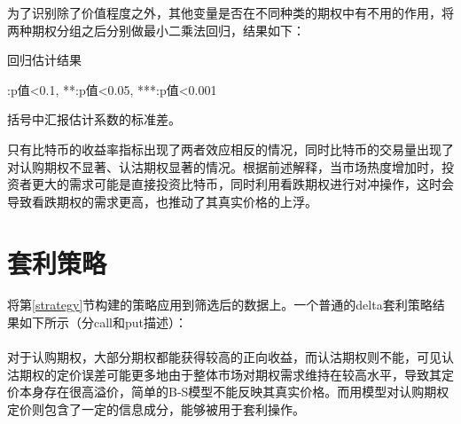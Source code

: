 \par{为了识别除了价值程度之外，其他变量是否在不同种类的期权中有不用的作用，将两种期权分组之后分别做最小二乘法回归，结果如下：}
\newpage
{}
\begin{center}
    \begin{threeparttable}[H]

        \caption{回归估计结果}
        
        \begin{tablenotes}
            \footnotesize
            \item *:p值<0.1, **:p值<0.05, ***:p值<0.001
            \item 括号中汇报估计系数的标准差。
        \end{tablenotes}
    \end{threeparttable}
\end{center}
\newpage
\restoregeometry
只有比特币的收益率指标出现了两者效应相反的情况，同时比特币的交易量出现了对认购期权不显著、认沽期权显著的情况。根据前述解释，当市场热度增加时，投资者更大的需求可能是直接投资比特币，同时利用看跌期权进行对冲操作，这时会导致看跌期权的需求更高，也推动了其真实价格的上浮。
\section{套利策略}
将第\ref{strategy}节构建的策略应用到筛选后的数据上。一个普通的delta套利策略结果如下所示（分call和put描述）：
~\\


~\\
对于认购期权，大部分期权都能获得较高的正向收益，而认沽期权则不能，可见认沽期权的定价误差可能更多地由于整体市场对期权需求维持在较高水平，导致其定价本身存在很高溢价，简单的B-S模型不能反映其真实价格。而用模型对认购期权定价则包含了一定的信息成分，能够被用于套利操作。
% 
% 
